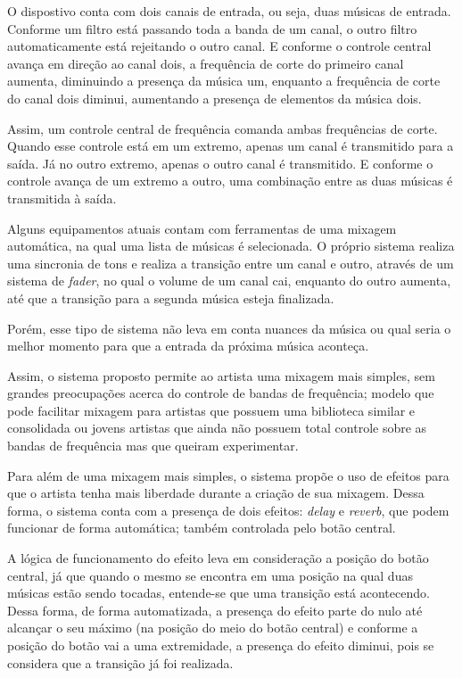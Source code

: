 \par
O dispostivo conta com dois canais de entrada, ou seja, duas músicas de entrada. Conforme um filtro está passando toda a banda de um canal, o outro filtro automaticamente está rejeitando o outro canal. E conforme o controle central avança em direção ao canal dois, a frequência de corte do primeiro canal aumenta, diminuindo a presença da música um, enquanto a frequência de corte do canal dois diminui, aumentando a presença de elementos da música dois. 
\par
Assim, um controle central de frequência comanda ambas frequências de corte. Quando esse controle está em um extremo, apenas um canal é transmitido para a saída. Já no outro extremo, apenas o outro canal é transmitido. E conforme o controle avança de um extremo a outro, uma combinação entre as duas músicas é transmitida à saída.
\par
Alguns equipamentos atuais contam com ferramentas de uma mixagem automática, na qual uma lista de músicas é selecionada. O próprio sistema realiza uma sincronia de tons e realiza a transição entre um canal e outro, através de um sistema de \textit{fader}, no qual o volume de um canal cai, enquanto do outro aumenta, até que a transição para a segunda música esteja finalizada.
\par
Porém, esse tipo de sistema não leva em conta nuances da música ou qual seria o melhor momento para que a entrada da próxima música aconteça.
\par
Assim, o sistema proposto permite ao artista uma mixagem mais simples, sem grandes preocupações acerca do controle de bandas de frequência; modelo que pode facilitar mixagem para artistas que possuem uma biblioteca similar e consolidada ou jovens artistas que ainda não possuem total controle sobre as bandas de frequência mas que queiram experimentar.
\par
Para além de uma mixagem mais simples, o sistema propõe o uso de efeitos para que o artista tenha mais liberdade durante a criação de sua mixagem. Dessa forma, o sistema conta com a presença de dois efeitos: \textit{delay} e \textit{reverb}, que podem funcionar de forma automática; também controlada pelo botão central.
\par
A lógica de funcionamento do efeito leva em consideração a posição do botão central, já que quando o mesmo se encontra em uma posição na qual duas músicas estão sendo tocadas, entende-se que uma transição está acontecendo. Dessa forma, de forma automatizada, a presença do efeito parte do nulo até alcançar o seu máximo (na posição do meio do botão central) e conforme a posição do botão vai a uma extremidade, a presença do efeito diminui, pois se considera que a transição já foi realizada.
